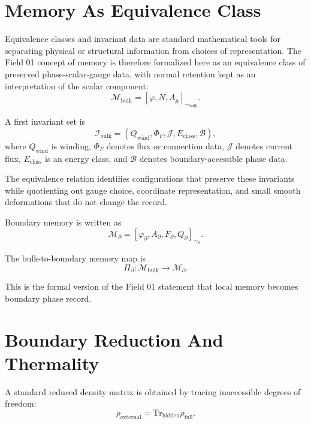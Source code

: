 \documentclass[11pt,a4paper]{article}
\newcommand{\phase}{\varphi}
\newcommand{\memory}{\mathcal{M}}
\newcommand{\boundary}{\partial}
\newcommand{\bulk}{\mathrm{bulk}}
\newcommand{\wind}{\mathrm{wind}}
\begin{document}
\section{Memory As Equivalence Class}

Equivalence classes and invariant data are standard mathematical tools for separating physical or structural information from choices of representation. The Field 01 concept of memory is therefore formalized here as an equivalence class of preserved phase-scalar-gauge data, with normal retention kept as an interpretation of the scalar component:
\begin{equation}
\memory_{\bulk}
=[\phase,N,A_\mu]_{\sim_{\bulk}}.
\end{equation}

A first invariant set is
\begin{equation}
\mathcal{I}_{\bulk}
=(Q_{\wind},\Phi_F,\mathcal{J},E_{\mathrm{class}},\mathcal{B}),
\end{equation}
where $Q_{\wind}$ is winding, $\Phi_F$ denotes flux or connection data, $\mathcal{J}$ denotes current flux, $E_{\mathrm{class}}$ is an energy class, and $\mathcal{B}$ denotes boundary-accessible phase data.

The equivalence relation identifies configurations that preserve these invariants while quotienting out gauge choice, coordinate representation, and small smooth deformations that do not change the record.

Boundary memory is written as
\begin{equation}
\memory_{\boundary}
=[\phase_{\boundary},A_{\boundary},F_{\boundary},Q_{\boundary}]_{\sim_{\boundary}}.
\end{equation}

The bulk-to-boundary memory map is
\begin{equation}
\Pi_{\boundary}:\memory_{\bulk}\to\memory_{\boundary}.
\end{equation}

This is the formal version of the Field 01 statement that local memory becomes boundary phase record.

\section{Boundary Reduction And Thermality}

A standard reduced density matrix is obtained by tracing inaccessible degrees of freedom:
\begin{equation}
\rho_{\mathrm{external}}
=\mathrm{Tr}_{\mathrm{hidden}}\rho_{\mathrm{full}}.
\end{equation}
\end{document}
